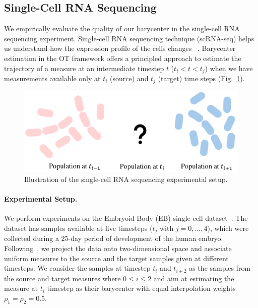 \subsection{Single-Cell RNA Sequencing}\label{exp:bary}
We empirically evaluate the quality of our barycenter in the single-cell RNA sequencing experiment. Single-cell RNA sequencing technique (scRNA-seq) helps us understand how the expression profile of the cells changes ~\citep{bioapp19}.
Barycenter estimation in the OT framework offers a principled approach to estimate the trajectory of a measure at an intermediate timestep $t$ ($t_i<t<t_j$) when we have measurements available only at $t_i$ (source) and $t_j$ (target) time steps (Fig.~\ref{fig:CPD}).
\begin{figure}[t]
    \centering
    \includegraphics[width=0.5\linewidth]{chapter-1/images/CPD.pdf}
    \caption[Illustration of the single-cell RNA sequencing experimental setup.]{Illustration of the single-cell RNA sequencing experimental setup.}
    \label{fig:CPD}
\end{figure}

\paragraph{Experimental Setup.}
We perform experiments on the Embryoid Body (EB) single-cell dataset~\citep{moon19a}. The dataset has samples available at five timesteps ($t_j$ with $j=0,\ldots,4$), which were collected during a 25-day period of development of the human embryo. Following~\cite{TNet20}, we project the data onto two-dimensional space and associate uniform measures to the source and the target samples given at different timesteps. 
We consider the samples at timestep $t_i$ and $t_{i+2}$ as the samples from the source and target measures where $0\leq i \leq 2$ and aim at estimating the measure at $t_i$ timestep as their barycenter with equal interpolation weights $\rho_1 = \rho_2 = 0.5$. 

